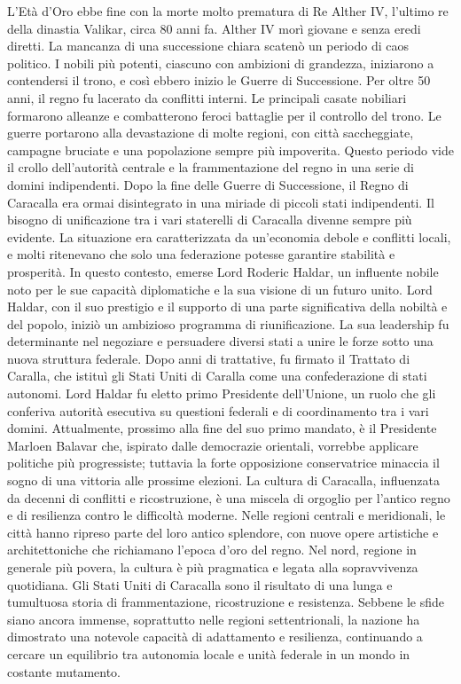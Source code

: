 \documentclass[a4paper]{report}
\begin{document}
\begin{multicols}{2}
L'Età d'Oro ebbe fine con la morte molto prematura di Re Alther IV, l'ultimo re della dinastia Valikar, circa 80 anni fa. Alther IV morì giovane e senza eredi diretti. La mancanza di una successione chiara scatenò un periodo di caos politico. I nobili più potenti, ciascuno con ambizioni di grandezza, iniziarono a contendersi il trono, e così ebbero inizio le Guerre di Successione.
Per oltre 50 anni, il regno fu lacerato da conflitti interni. Le principali casate nobiliari formarono alleanze e combatterono feroci battaglie per il controllo del trono. Le guerre portarono alla devastazione di molte regioni, con città saccheggiate, campagne bruciate e una popolazione sempre più impoverita. Questo periodo vide il crollo dell’autorità centrale e la frammentazione del regno in una serie di domini indipendenti.
Dopo la fine delle Guerre di Successione, il Regno di Caracalla era ormai disintegrato in una miriade di piccoli stati indipendenti.
Il bisogno di unificazione tra i vari staterelli di Caracalla divenne sempre più evidente. La situazione era caratterizzata da un'economia debole e conflitti locali, e molti ritenevano che solo una federazione potesse garantire stabilità e prosperità.
In questo contesto, emerse Lord Roderic Haldar, un influente nobile noto per le sue capacità diplomatiche e la sua visione di un futuro unito. Lord Haldar, con il suo prestigio e il supporto di una parte significativa della nobiltà e del popolo, iniziò un ambizioso programma di riunificazione. La sua leadership fu determinante nel negoziare e persuadere diversi stati a unire le forze sotto una nuova struttura federale. Dopo anni di trattative, fu firmato il Trattato di Caralla, che istituì gli Stati Uniti di Caralla come una confederazione di stati autonomi. Lord Haldar fu eletto primo Presidente dell'Unione, un ruolo che gli conferiva autorità esecutiva su questioni federali e di coordinamento tra i vari domini.
Attualmente, prossimo alla fine del suo primo mandato, è il Presidente Marloen Balavar che, ispirato dalle democrazie orientali, vorrebbe applicare politiche più progressiste; tuttavia la forte opposizione conservatrice minaccia il sogno di una vittoria alle prossime elezioni.
La cultura di Caracalla, influenzata da decenni di conflitti e ricostruzione, è una miscela di orgoglio per l’antico regno e di resilienza contro le difficoltà moderne. Nelle regioni centrali e meridionali, le città hanno ripreso parte del loro antico splendore, con nuove opere artistiche e architettoniche che richiamano l'epoca d'oro del regno. Nel nord, regione in generale più povera, la cultura è più pragmatica e legata alla sopravvivenza quotidiana.
Gli Stati Uniti di Caracalla sono il risultato di una lunga e tumultuosa storia di frammentazione, ricostruzione e resistenza. Sebbene le sfide siano ancora immense, soprattutto nelle regioni settentrionali, la nazione ha dimostrato una notevole capacità di adattamento e resilienza, continuando a cercare un equilibrio tra autonomia locale e unità federale in un mondo in costante mutamento.


\end{multicols}
\end{document}
